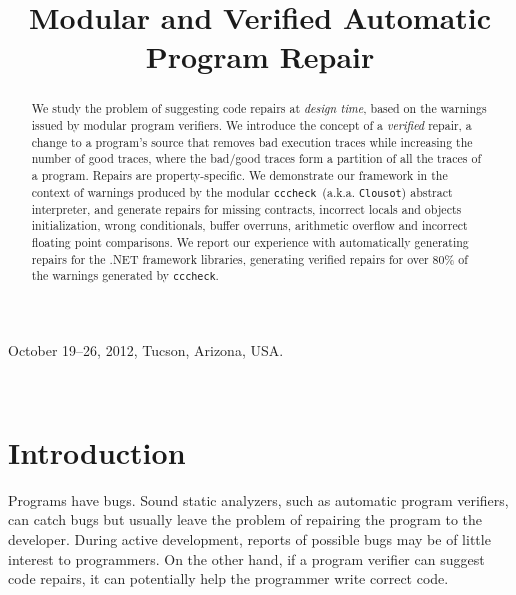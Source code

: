 \documentclass[10pt]{sigplanconf}
\title{Modular and Verified Automatic Program Repair}
\newcommand{\code}[1]{\texttt{#1}}
\newcommand{\clousot}{\code{cccheck}}
\begin{document}
 {October 19--26, 2012, Tucson, Arizona, USA.}
\maketitle

\begin{abstract}

We study the problem of suggesting code repairs at \emph{design time},
based on the warnings issued by modular program verifiers. We
introduce the concept of a \emph{verified} repair, a change to a program's
source that removes bad execution traces while increasing the number
of good traces, where the bad/good traces form a partition of all the
traces of a program. Repairs are property-specific. We demonstrate our
framework in the context of warnings produced by the modular \clousot~(a.k.a. \code{Clousot})
abstract interpreter, and generate repairs for missing contracts,
incorrect locals and objects initialization, wrong conditionals,
buffer overruns, arithmetic overflow and incorrect floating point
comparisons.  We report our experience with automatically generating
repairs for the .NET framework libraries, generating verified repairs
for over 80\% of the warnings generated by \clousot.

\end{abstract}



\


\section{Introduction}

Programs have bugs. Sound static analyzers, such as automatic program
verifiers, can catch bugs but usually leave the problem of repairing
the program to the developer.  During active development, reports of
possible bugs may be of little interest to programmers. On the other
hand, if a program verifier can suggest code repairs, it can
potentially help the programmer write correct code.
\end{document}
